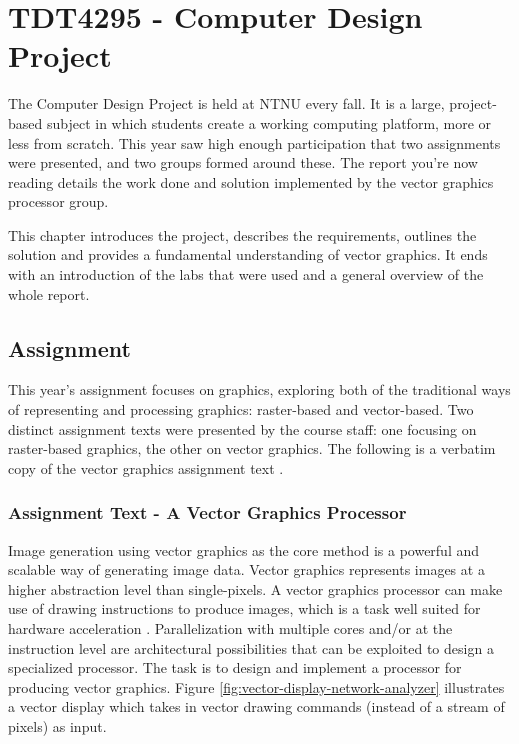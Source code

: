 \chapter{TDT4295 - Computer Design Project}
\label{sec:intro}

The Computer Design Project is held at NTNU every fall.
It is a large, project-based subject in which students create a working computing platform, more or less from scratch.
This year saw high enough participation that two assignments were presented, and two groups formed around these.
The report you're now reading details the work done and solution implemented by the vector graphics processor group.

This chapter introduces the project, describes the requirements, outlines the solution and provides a fundamental understanding of vector graphics. It ends with an introduction of the labs that were used and a general overview of the whole report.

\section{Assignment}

This year's assignment focuses on graphics, exploring both of the traditional ways of representing and processing graphics: raster-based and vector-based.
Two distinct assignment texts were presented by the course staff: one focusing on raster-based graphics, the other on vector graphics.
The following is a verbatim copy of the vector graphics assignment text \cite{assignment-text}.

\subsection{Assignment Text - A Vector Graphics Processor}

Image generation using vector graphics as the core method is a powerful and scalable way of generating image data.
Vector graphics represents images at a higher abstraction level than single-pixels.
A vector graphics processor can make use of drawing instructions to produce images, which is a task well suited for hardware acceleration \cite{openvg}.
Parallelization with multiple cores and/or at the instruction level are architectural possibilities that can be exploited to design a specialized processor.
The task is to design and implement a processor for producing vector graphics.
Figure \ref{fig:vector-display-network-analyzer} illustrates a vector display which takes in vector drawing commands (instead of a stream of pixels) as input.

